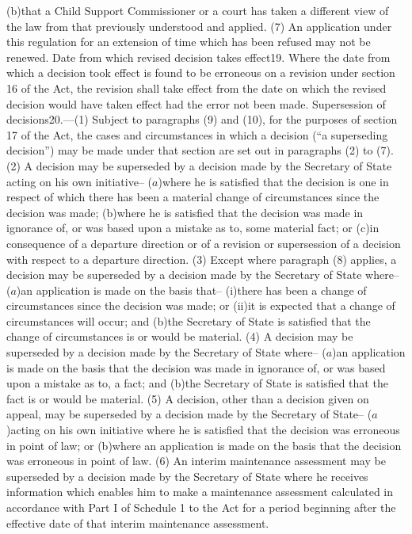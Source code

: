 \documentclass[12pt,a4paper]{article}
\begin{document}
(b)that a Child Support Commissioner or a court has taken a different view of the law from that previously understood and applied.
(7) An application under this regulation for an extension of time which has been refused may not be renewed.
Date from which revised decision takes effect19.  Where the date from which a decision took effect is found to be erroneous on a revision under section 16 of the Act, the revision shall take effect from the date on which the revised decision would have taken effect had the error not been made.
Supersession of decisions20.—(1) Subject to paragraphs (9) and (10), for the purposes of section 17 of the Act, the cases and circumstances in which a decision (“a superseding decision”) may be made under that section are set out in paragraphs (2) to (7).
(2) A decision may be superseded by a decision made by the Secretary of State acting on his own initiative–
($a$)where he is satisfied that the decision is one in respect of which there has been a material change of circumstances since the decision was made;
(b)where he is satisfied that the decision was made in ignorance of, or was based upon a mistake as to, some material fact; or
(c)in consequence of a departure direction or of a revision or supersession of a decision with respect to a departure direction.
(3) Except where paragraph (8) applies, a decision may be superseded by a decision made by the Secretary of State where–
($a$)an application is made on the basis that–
(i)there has been a change of circumstances since the decision was made; or
(ii)it is expected that a change of circumstances will occur; and
(b)the Secretary of State is satisfied that the change of circumstances is or would be material.
(4) A decision may be superseded by a decision made by the Secretary of State where–
($a$)an application is made on the basis that the decision was made in ignorance of, or was based upon a mistake as to, a fact; and
(b)the Secretary of State is satisfied that the fact is or would be material.
(5) A decision, other than a decision given on appeal, may be superseded by a decision made by the Secretary of State–
($a$)acting on his own initiative where he is satisfied that the decision was erroneous in point of law; or
(b)where an application is made on the basis that the decision was erroneous in point of law.
(6) An interim maintenance assessment may be superseded by a decision made by the Secretary of State where he receives information which enables him to make a maintenance assessment calculated in accordance with Part I of Schedule 1 to the Act for a period beginning after the effective date of that interim maintenance assessment.
\end{document}
